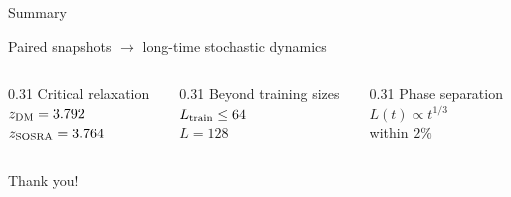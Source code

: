 \documentclass[11pt,UTF8]{beamer}
\begin{document}
\begin{frame}{Summary}
  \begin{center}
    {\large Paired snapshots $\longrightarrow$ long-time stochastic dynamics}
  \end{center}
  \vspace{1.2em}
  \begin{columns}[T,onlytextwidth]
    \begin{column}{0.31\textwidth}
      \centering
      {\small Critical relaxation}\\[0.8em]
      {\alert{\large $z_{\rm DM}=3.792$}}\\[0.4em]
      {\small $z_{\rm SOSRA}=3.764$}
    \end{column}
    \begin{column}{0.31\textwidth}
      \centering
      {\small Beyond training sizes}\\[0.8em]
      {$L_{\rm train}\le64$}\\[0.4em]
      {\alert{\Large $L=128$}}
    \end{column}
    \begin{column}{0.31\textwidth}
      \centering
      {\small Phase separation}\\[0.8em]
      {\alert{\large $L(t)\propto t^{1/3}$}}\\[0.4em]
      {\small within $2\%$}
    \end{column}
  \end{columns}
  \vfill
  \begin{center}
    {\large Thank you!}
  \end{center}
\end{frame}
\end{document}
